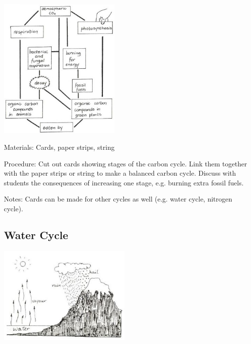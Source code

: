 \begin{multicols}{2}
\begin{center}
\includegraphics[width=0.45\textwidth]{./img/vso/carbon-cycle.jpg}
\end{center}

\begin{description*}
\item[Materials:]{Cards, paper strips, string}
\item[Procedure:]{Cut out cards showing stages of
the carbon cycle. Link them
together with the paper strips or string to
make a balanced carbon cycle.
Discuss with students the
consequences of increasing one
stage, e.g. burning extra fossil
fuels.}
\item[Notes:]{Cards can be made for other cycles as well (e.g. water cycle, nitrogen cycle).}
\end{description*}

\columnbreak

\subsection{Water Cycle} 

\begin{center}
\includegraphics[width=0.49\textwidth]{./img/source/water-cycle.jpg}
\end{center}


\end{multicols}
